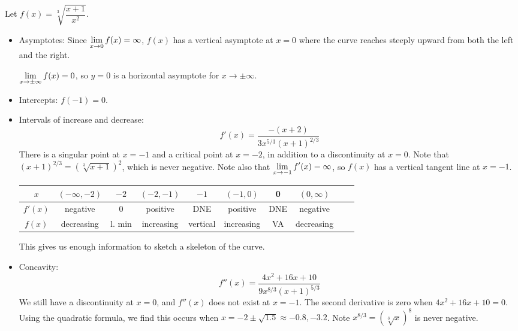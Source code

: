 \begin{solution}
Let $f(x)=\sqrt[3]{\dfrac{x+1}{x^2}}$.
\begin{itemize}
\item Asymptotes: Since $\displaystyle\lim_{x \to 0} f(x) = \infty$, $f(x)$ has a vertical asymptote at $x=0$ where the curve reaches steeply upward from both the left and the right.

$\displaystyle\lim_{x \to \pm \infty} f(x)=0$, so $y=0$ is a horizontal asymptote for $x \to \pm \infty$.
\item Intercepts: $f(-1)=0$.
\item Intervals of increase and decrease:
\[f'(x)=\dfrac{-(x+2)}{3x^{5/3}(x+1)^{2/3}}\]
There is a singular point at $x=-1$ and a critical point at $x=-2$, in addition to a discontinuity at $x=0$. Note that $(x+1)^{2/3}=\left(\sqrt[3]{x+1}\right)^2$, which is never negative. Note also that $\displaystyle\lim_{x \to -1}f'(x)=\infty$, so $f(x)$ has a vertical tangent line at $x=-1$.

\begin{center}
\begin{tabular}{|c||c|c|c|c|c|c|c|c|c|}
\hline
$x$&$(-\infty,-2)$&$-2$&$(-2,-1)$&$-1$&$(-1,0)$&0&$(0,\infty)$
\\
\hline
$f'(x)$&negative&0&positive&DNE&positive&DNE&negative\\
\hline
$f(x)$&decreasing&l. min&increasing&vertical&increasing&VA&decreasing\\
\hline
\end{tabular}
\end{center}
This gives us enough information to sketch a skeleton of the curve.
\begin{center}\end{center}

\item Concavity:
\[f''(x)=\dfrac{4x^2+16x+10}{9x^{8/3}(x+1)^{5/3}}\]
We still have a discontinuity at $x=0$, and $f''(x)$ does not exist at $x=-1$. The second derivative is zero when $4x^2+16x+10=0$. Using the quadratic formula, we find this occurs when $x=-2\pm\sqrt{1.5} \approx -0.8,-3.2$. Note $x^{8/3}=\left(\sqrt[3]{x}\right)^8$ is never negative.


\end{itemize}
\end{solution}
